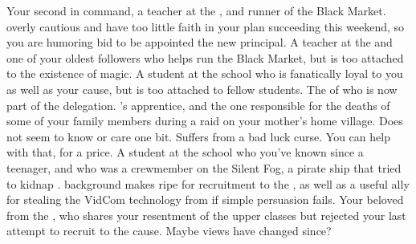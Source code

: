\documentclass[char]{GL2020}
\begin{document}
\begin{contacts}
    \contact{\cChupSecond{}} Your second in command, a teacher at the \pSc{}, and runner of the Black Market. \cChupSecond{\Theyare} overly cautious and have too little faith in your plan succeeding this weekend, so you are humoring \cChupSecond{\their} bid to be appointed the new principal.
    \contact{\cChupInventor{}} A teacher at the \pSc{} and one of your oldest followers who helps run the Black Market, but is too attached to the existence of magic. 
    \contact{\cChupStudent{}} A student at the school who is fanatically loyal to you as well as your cause, but is too attached to \cChupStudent{\their} fellow students. 
    \contact{\cEbbPriest{}} The \cEbbPriest{\cleric} of \cEbb{} who is now part of the \pShip{} delegation.
    \contact{\cJuniorStatesman{}} \cHeadDiplomat{}'s apprentice, and the one responsible for the deaths of some of your \cCurse{\formal} family members during a \pShippie{} raid on your mother's home village. Does not seem to know or care one bit.
    \contact{\cInitiate{}} Suffers from a bad luck curse. You can help with that, for a price.
    \contact{\cPirateChild{}} A student at the school  who you've known since \cPirateChild{\theywere} a teenager, and who was a crewmember on the Silent Fog, a pirate ship that tried to kidnap \cHeadDiplomat{}. \cPirateChild{\Their} background makes \cPirateChild{\them} ripe for recruitment to the \pGoaties{}, as well as a useful ally for stealing the VidCom technology from \cTechStar{} if simple persuasion fails.
    \contact{\cCurse{}} Your beloved \cCurse{\auncle} from the \pFarm{}, who shares your resentment of the upper classes but rejected your last attempt to recruit \cCurse{\them} to the cause. Maybe \cCurse{\their} views have changed since?
\end{contacts}
\end{document}
